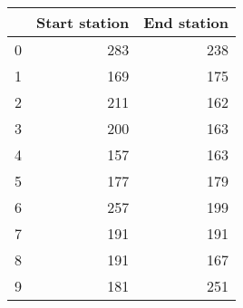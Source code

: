 \begin{tabular}{lrr}
\toprule
{} &  Start station &  End station \\
\midrule
0 &            283 &          238 \\
1 &            169 &          175 \\
2 &            211 &          162 \\
3 &            200 &          163 \\
4 &            157 &          163 \\
5 &            177 &          179 \\
6 &            257 &          199 \\
7 &            191 &          191 \\
8 &            191 &          167 \\
9 &            181 &          251 \\
\bottomrule
\end{tabular}
